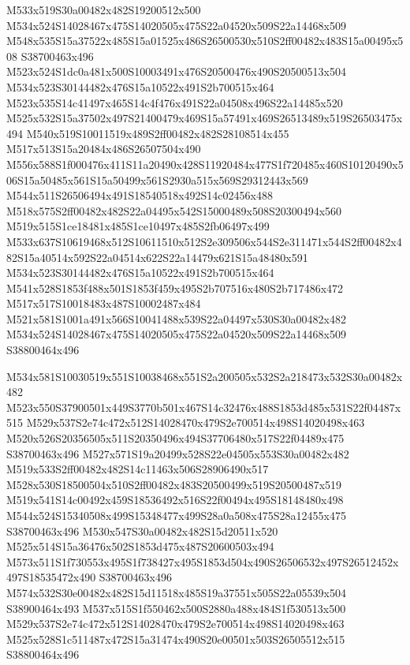 \documentclass{article}
\begin{document}
\begin{multicols}{2}
M533x519S30a00482x482S19200512x500 M534x524S14028467x475S14020505x475S22a04520x509S22a14468x509 M548x535S15a37522x485S15a01525x486S26500530x510S2ff00482x483S15a00495x508 S38700463x496 M523x524S1dc0a481x500S10003491x476S20500476x490S20500513x504 M534x523S30144482x476S15a10522x491S2b700515x464 M523x535S14c41497x465S14c4f476x491S22a04508x496S22a14485x520 M525x532S15a37502x497S21400479x469S15a57491x469S26513489x519S26503475x494 M540x519S10011519x489S2ff00482x482S28108514x455 M517x513S15a20484x486S26507504x490 M556x588S1f000476x411S11a20490x428S11920484x477S1f720485x460S10120490x506S15a50485x561S15a50499x561S2930a515x569S29312443x569 M544x511S26506494x491S18540518x492S14c02456x488 M518x575S2ff00482x482S22a04495x542S15000489x508S20300494x560 M519x515S1ce18481x485S1ce10497x485S2fb06497x499 M533x637S10619468x512S10611510x512S2e309506x544S2e311471x544S2ff00482x482S15a40514x592S22a04514x622S22a14479x621S15a48480x591 M534x523S30144482x476S15a10522x491S2b700515x464 M541x528S1853f488x501S1853f459x495S2b707516x480S2b717486x472 M517x517S10018483x487S10002487x484 M521x581S1001a491x566S10041488x539S22a04497x530S30a00482x482 M534x524S14028467x475S14020505x475S22a04520x509S22a14468x509 S38800464x496

M534x581S10030519x551S10038468x551S2a200505x532S2a218473x532S30a00482x482 M523x550S37900501x449S3770b501x467S14c32476x488S1853d485x531S22f04487x515 M529x537S2e74c472x512S14028470x479S2e700514x498S14020498x463 M520x526S20356505x511S20350496x494S37706480x517S22f04489x475 S38700463x496 M527x571S19a20499x528S22e04505x553S30a00482x482 M519x533S2ff00482x482S14c11463x506S28906490x517 M528x530S18500504x510S2ff00482x483S20500499x519S20500487x519 M519x541S14c00492x459S18536492x516S22f00494x495S18148480x498 M544x524S15340508x499S15348477x499S28a0a508x475S28a12455x475 S38700463x496 M530x547S30a00482x482S15d20511x520 M525x514S15a36476x502S1853d475x487S20600503x494 M573x511S1f730553x495S1f738427x495S1853d504x490S26506532x497S26512452x497S18535472x490 S38700463x496 M574x532S30e00482x482S15d11518x485S19a37551x505S22a05539x504 S38900464x493 M537x515S1f550462x500S2880a488x484S1f530513x500 M529x537S2e74c472x512S14028470x479S2e700514x498S14020498x463 M525x528S1c511487x472S15a31474x490S20e00501x503S26505512x515 S38800464x496


\end{multicols}
\end{document}
